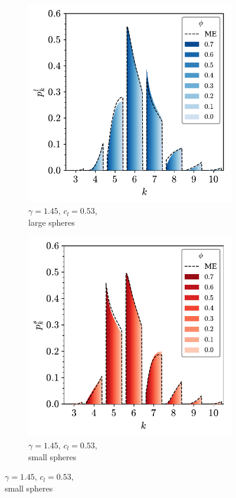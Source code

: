 \begin{figure}[bt]
     \centering
     
      \begin{subfigure}[b]{0.45\textwidth}
         \centering
         \includegraphics[width=\textwidth]{./figures/quasi2d/phi_me_l_53.pdf}
         \caption{$\gamma=1.45$, $c_l=0.53$, \\large spheres}
         \label{fig:bime1}
     \end{subfigure}
     \hfill
      \begin{subfigure}[b]{0.45\textwidth}
         \centering
         \includegraphics[width=\textwidth]{./figures/quasi2d/phi_me_s_53.pdf}
         \caption{$\gamma=1.45$, $c_l=0.53$, \\small spheres}
         \label{fig:bime2}
     \end{subfigure}
     \hfill
     

\end{figure}
